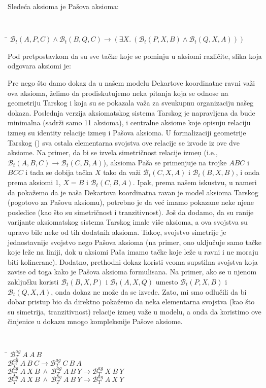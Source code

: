 \documentclass[a4paper, 12pt]{article}
\newcommand{\agbett}[3]{\ensuremath{\mathcal{B}_T^{\mathit{ag}}\ #1\ #2\ #3}}
\newcommand{\bett}[3]{\ensuremath{\mathcal{B}_t(#1, #2, #3)}}
\begin{document}
Slede\'ca aksioma je Pa\v sova aksioma:
{\tt
\begin{tabbing}
\hspace{5mm}\=\kill
$\bett{A}{P}{C} \wedge \bett{B}{Q}{C} \longrightarrow (\exists X.\ (\bett{P}{X}{B} \wedge \bett{Q}{X}{A}))$
\end{tabbing}
}

Pod pretpostavkom da su sve ta\v cke koje se pominju u aksiomi razli\v cite, slika koja odgovara aksiomi je:

\begin{center}

\end{center}

Pre nego \v sto damo dokaz da u na\v sem modelu Dekartove koordinatne ravni va\v zi ova aksioma, \v zelimo da prodiskutujemo neka pitanja koja se odnose na geometriju Tarskog i koja su se pokazala va\v za za sveukupnu organizaciju na\v seg dokaza. Poslednja verzija aksiomatskog sistema Tarskog je napravljena da bude minimalna (sadr\v zi samo 11 aksioma), i centralne aksiome koje opisuju relaciju izme\d u su {\lat identity} relacije izme\d u i Pa\v sova aksioma. U formalizaciji geometrije Tarskog (\cite{narboux}) sva ostala elementarna svojstva ove relacije se izvode iz ove dve aksiome. Na primer, da bi se izvela simetri\v cnost relacije izme\d u (i.e.,
$\bett{A}{B}{C} \longrightarrow \bett{C}{B}{A}$), aksioma Pa\v sa se primenjuje na trojke $ABC$ i $BCC$ i tada se dobija ta\v cka $X$ tako da va\v zi $\bett{C}{X}{A}$ i $\bett{B}{X}{B}$, i onda prema aksiomi 1, $X=B$ i $\bett{C}{B}{A}$. Ipak, prema na\v sem iskustvu, u nameri da poka\v zemo da je na\v sa Dekartova koordinatna ravan je model aksioma Tarskog (pogotovo za Pa\v sovu aksiomu), potrebno je da ve\' c imamo pokazane neke njene posledice (kao \v sto su simetri\v cnost i tranzitivnost). Jo\v s da dodamo, da su ranije varijante aksiomatskog sistema Tarskog imale vi\v se aksioma, a ova svojstva su upravo bile neke od tih dodatnih aksioma. Tako\d e, svojstvo simetrije je jednostavnije svojstvo nego Pa\v sova aksioma (na primer, ono uklju\v cuje samo ta\v cke koje le\v ze na liniji, dok u aksiomi Pa\v sa imamo ta\v cke koje le\v ze u ravni i ne moraju biti kolinerane). Dodatno, prethodni dokaz koristi veoma supstilna svojstva koja zavise od toga kako je Pa\v sova aksioma formulisana. Na primer, ako se u njenom zaklju\v cku koristi $\bett{B}{X}{P}$ i $\bett{A}{X}{Q}$ umesto $\bett{P}{X}{B}$ i $\bett{Q}{X}{A}$, onda dokaz ne mo\v ze da se izvede. Zato, mi smo odlu\v cili da bi dobar pristup bio da direktno poka\v zemo da neka elementarna svojstva (kao \v sto su simetrija, tranzitivnost) relacije izme\d u va\v ze u modelu, a onda da koristimo ove \v cinjenice u dokazu mnogo kompleksnije Pa\v sove aksiome.  

{\tt
\begin{tabbing}
\hspace{5mm}\=\kill
\>$\agbett{A}{A}{B}$\\
\>$\agbett{A}{B}{C} \longrightarrow \agbett{C}{B}{A}$\\
\>$\agbett{A}{X}{B}\ \wedge\ \agbett{A}{B}{Y} \longrightarrow \agbett{X}{B}{Y}$\\
\>$\agbett{A}{X}{B}\ \wedge\ \agbett{A}{B}{Y} \longrightarrow \agbett{A}{X}{Y}$
\end{tabbing}
}
\end{document}
